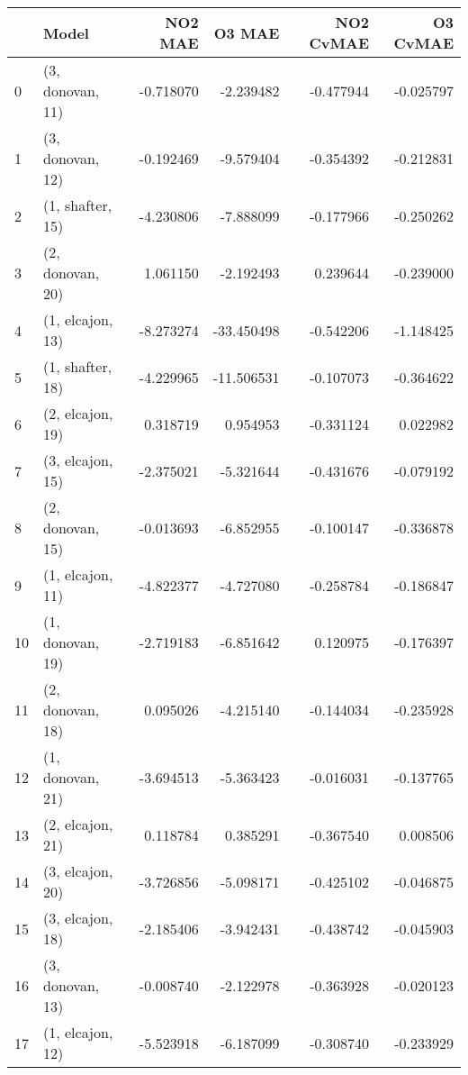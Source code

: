 \begin{tabular}{llrrrr}
\toprule
{} &             Model &   NO2 MAE &     O3 MAE &  NO2 CvMAE &  O3 CvMAE \\
\midrule
0  &  (3, donovan, 11) & -0.718070 &  -2.239482 &  -0.477944 & -0.025797 \\
1  &  (3, donovan, 12) & -0.192469 &  -9.579404 &  -0.354392 & -0.212831 \\
2  &  (1, shafter, 15) & -4.230806 &  -7.888099 &  -0.177966 & -0.250262 \\
3  &  (2, donovan, 20) &  1.061150 &  -2.192493 &   0.239644 & -0.239000 \\
4  &  (1, elcajon, 13) & -8.273274 & -33.450498 &  -0.542206 & -1.148425 \\
5  &  (1, shafter, 18) & -4.229965 & -11.506531 &  -0.107073 & -0.364622 \\
6  &  (2, elcajon, 19) &  0.318719 &   0.954953 &  -0.331124 &  0.022982 \\
7  &  (3, elcajon, 15) & -2.375021 &  -5.321644 &  -0.431676 & -0.079192 \\
8  &  (2, donovan, 15) & -0.013693 &  -6.852955 &  -0.100147 & -0.336878 \\
9  &  (1, elcajon, 11) & -4.822377 &  -4.727080 &  -0.258784 & -0.186847 \\
10 &  (1, donovan, 19) & -2.719183 &  -6.851642 &   0.120975 & -0.176397 \\
11 &  (2, donovan, 18) &  0.095026 &  -4.215140 &  -0.144034 & -0.235928 \\
12 &  (1, donovan, 21) & -3.694513 &  -5.363423 &  -0.016031 & -0.137765 \\
13 &  (2, elcajon, 21) &  0.118784 &   0.385291 &  -0.367540 &  0.008506 \\
14 &  (3, elcajon, 20) & -3.726856 &  -5.098171 &  -0.425102 & -0.046875 \\
15 &  (3, elcajon, 18) & -2.185406 &  -3.942431 &  -0.438742 & -0.045903 \\
16 &  (3, donovan, 13) & -0.008740 &  -2.122978 &  -0.363928 & -0.020123 \\
17 &  (1, elcajon, 12) & -5.523918 &  -6.187099 &  -0.308740 & -0.233929 \\
\bottomrule
\end{tabular}
